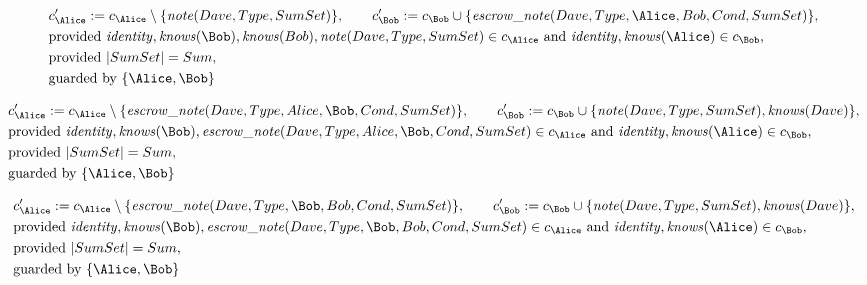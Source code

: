 \begin{align*}
&
c'_
{
\Alice
}
 := 
c_
{
\Alice
}
 \setminus 
\{
\mathit{\detokenize{
note
}}
(
Dave
,
Type
,
SumSet
)
\}
, \qquad 
c'_
{
\Bob
}
 := 
c_
{
\Bob
}
 \cup 
\{
\mathit{\detokenize{
escrow_note
}}
(
Dave
,
Type
,
\Alice
,
Bob
,
Cond
,
SumSet
)
\}
,\\
&
\text{provided } 
\mathit{\detokenize{
identity
}}
,
\mathit{\detokenize{
knows
}}
(
\Bob
)
,
\mathit{\detokenize{
knows
}}
(
Bob
)
,
\mathit{\detokenize{
note
}}
(
Dave
,
Type
,
SumSet
)
 \in c_
{
\Alice
}
 \text{ and } 
\mathit{\detokenize{
identity
}}
,
\mathit{\detokenize{
knows
}}
(
\Alice
)
 \in c_
{
\Bob
}
,\\
&
\text{provided } 
|
SumSet
|
=
Sum
,\\
&
\text{guarded by } \{
\Alice
,
\Bob
\}
\end{align*}

\begin{align*}
&
c'_
{
\Alice
}
 := 
c_
{
\Alice
}
 \setminus 
\{
\mathit{\detokenize{
escrow_note
}}
(
Dave
,
Type
,
Alice
,
\Bob
,
Cond
,
SumSet
)
\}
, \qquad 
c'_
{
\Bob
}
 := 
c_
{
\Bob
}
 \cup 
\{
\mathit{\detokenize{
note
}}
(
Dave
,
Type
,
SumSet
)
,
\mathit{\detokenize{
knows
}}
(
Dave
)
\}
,\\
&
\text{provided } 
\mathit{\detokenize{
identity
}}
,
\mathit{\detokenize{
knows
}}
(
\Bob
)
,
\mathit{\detokenize{
escrow_note
}}
(
Dave
,
Type
,
Alice
,
\Bob
,
Cond
,
SumSet
)
 \in c_
{
\Alice
}
 \text{ and } 
\mathit{\detokenize{
identity
}}
,
\mathit{\detokenize{
knows
}}
(
\Alice
)
 \in c_
{
\Bob
}
,\\
&
\text{provided } 
|
SumSet
|
=
Sum
,\\
&
\text{guarded by } \{
\Alice
,
\Bob
\}
\end{align*}

\begin{align*}
&
c'_
{
\Alice
}
 := 
c_
{
\Alice
}
 \setminus 
\{
\mathit{\detokenize{
escrow_note
}}
(
Dave
,
Type
,
\Bob
,
Bob
,
Cond
,
SumSet
)
\}
, \qquad 
c'_
{
\Bob
}
 := 
c_
{
\Bob
}
 \cup 
\{
\mathit{\detokenize{
note
}}
(
Dave
,
Type
,
SumSet
)
,
\mathit{\detokenize{
knows
}}
(
Dave
)
\}
,\\
&
\text{provided } 
\mathit{\detokenize{
identity
}}
,
\mathit{\detokenize{
knows
}}
(
\Bob
)
,
\mathit{\detokenize{
escrow_note
}}
(
Dave
,
Type
,
\Bob
,
Bob
,
Cond
,
SumSet
)
 \in c_
{
\Alice
}
 \text{ and } 
\mathit{\detokenize{
identity
}}
,
\mathit{\detokenize{
knows
}}
(
\Alice
)
 \in c_
{
\Bob
}
,\\
&
\text{provided } 
|
SumSet
|
=
Sum
,\\
&
\text{guarded by } \{
\Alice
,
\Bob
\}
\end{align*}
